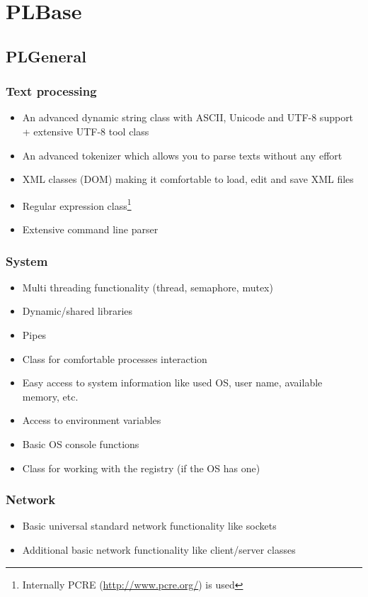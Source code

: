 \chapter{PLBase}




\section{PLGeneral}


\subsection{Text processing}
\begin{itemize}
\item{An advanced dynamic string class with ASCII, Unicode and UTF-8 support + extensive UTF-8 tool class}
\item{An advanced tokenizer which allows you to parse texts without any effort}
\item{XML classes (DOM) making it comfortable to load, edit and save XML files}
\item{Regular expression class\footnote{Internally PCRE (\url{http://www.pcre.org/}) is used}}
\item{Extensive command line parser}
\end{itemize}


\subsection{System}
\begin{itemize}
\item{Multi threading functionality (thread, semaphore, mutex)}
\item{Dynamic/shared libraries}
\item{Pipes}
\item{Class for comfortable processes interaction}
\item{Easy access to system information like used OS, user name, available memory, etc.}
\item{Access to environment variables}
\item{Basic OS console functions}
\item{Class for working with the registry (if the OS has one)}
\end{itemize}


\subsection{Network}
\begin{itemize}
\item{Basic universal standard network functionality like sockets}
\item{Additional basic network functionality like client/server classes}
\end{itemize}


